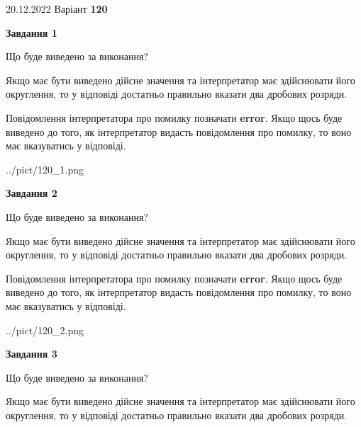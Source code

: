 \documentclass[12pt, ukrainian]{article}
\begin{document}
{20.12.2022 Варіант \No \textbf { 120 }\par}
{
\begin {Large}

{\begin {center}\textbf{Завдання 1}\end {center}}\par
Що буде виведено за виконання? \par

Якщо має бути виведено дійсне значення та інтерпретатор має здійснювати його округлення, 
то у відповіді достатньо правильно вказати два дробових розряди.

Повідомлення інтерпретатора про помилку позначати \textbf{error}.
Якщо щось буде виведено до того, як інтерпретатор видасть повідомлення про помилку, 
то воно має вказуватись у відповіді. \par

\begin{center}
	{../pict/120_1.png}
\end{center}
\newpage

{\begin {center}\textbf{Завдання 2}\end {center}}\par
Що буде виведено за виконання? \par

Якщо має бути виведено дійсне значення та інтерпретатор має здійснювати його округлення, 
то у відповіді достатньо правильно вказати два дробових розряди.

Повідомлення інтерпретатора про помилку позначати \textbf{error}.
Якщо щось буде виведено до того, як інтерпретатор видасть повідомлення про помилку, 
то воно має вказуватись у відповіді. \par

\begin{center}
	{../pict/120_2.png}
\end{center}
\newpage

{\begin {center}\textbf{Завдання 3}\end {center}}\par
Що буде виведено за виконання? \par

Якщо має бути виведено дійсне значення та інтерпретатор має здійснювати його округлення, 
то у відповіді достатньо правильно вказати два дробових розряди.


\end{Large}}
\end{document}
